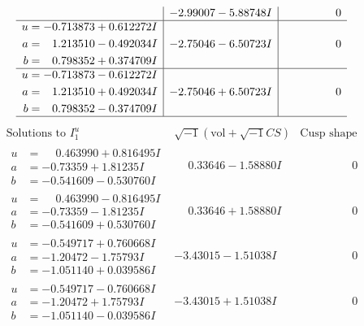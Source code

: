 \documentclass[1p]{elsarticle_modified}
\theoremstyle{definition}
\newcommand{\I}{\sqrt{-1}}
\begin{document}
$$\begin{array}{c|c|c}
 & -2.99007 - 5.88748 I & \phantom{-0.000000 } 0 \\ \hline\begin{aligned}
u &= -0.713873 + 0.612272 I \\
a &= \phantom{-}1.213510 - 0.492034 I \\
b &= \phantom{-}0.798352 + 0.374709 I\end{aligned}
 & -2.75046 - 6.50723 I & \phantom{-0.000000 } 0 \\ \hline\begin{aligned}
u &= -0.713873 - 0.612272 I \\
a &= \phantom{-}1.213510 + 0.492034 I \\
b &= \phantom{-}0.798352 - 0.374709 I\end{aligned}
 & -2.75046 + 6.50723 I & \phantom{-0.000000 } 0\\
 \hline 
 \end{array}$$\newpage$$\begin{array}{c|c|c}  
\text{Solutions to }I^u_{1}& \I (\text{vol} + \sqrt{-1}CS) & \text{Cusp shape}\\
 \hline 
\begin{aligned}
u &= \phantom{-}0.463990 + 0.816495 I \\
a &= -0.73359 + 1.81235 I \\
b &= -0.541609 - 0.530760 I\end{aligned}
 & \phantom{-}0.33646 - 1.58880 I & \phantom{-0.000000 } 0 \\ \hline\begin{aligned}
u &= \phantom{-}0.463990 - 0.816495 I \\
a &= -0.73359 - 1.81235 I \\
b &= -0.541609 + 0.530760 I\end{aligned}
 & \phantom{-}0.33646 + 1.58880 I & \phantom{-0.000000 } 0 \\ \hline\begin{aligned}
u &= -0.549717 + 0.760668 I \\
a &= -1.20472 - 1.75793 I \\
b &= -1.051140 + 0.039586 I\end{aligned}
 & -3.43015 - 1.51038 I & \phantom{-0.000000 } 0 \\ \hline\begin{aligned}
u &= -0.549717 - 0.760668 I \\
a &= -1.20472 + 1.75793 I \\
b &= -1.051140 - 0.039586 I\end{aligned}
 & -3.43015 + 1.51038 I & \phantom{-0.000000 } 0 \\ \hline\begin{aligned}

\end{aligned}
\end{array}$$
\end{document}
